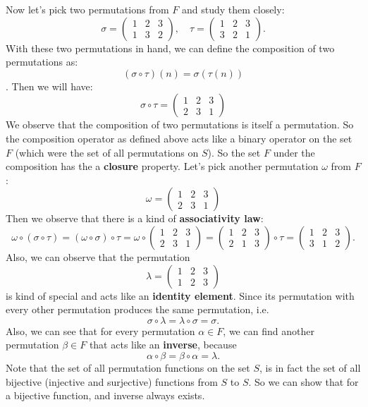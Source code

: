 Now let's pick two permutations from $F$ and study them closely:
\[ \sigma = \begin{pmatrix} 1 & 2 & 3 \\ 1 & 3 & 2 \end{pmatrix}, \quad
	\tau = \begin{pmatrix} 1 & 2 & 3 \\ 3 & 2 & 1 \end{pmatrix}. \]
With these two permutations in hand, we can define the composition of two permutations as: \[(\sigma \circ \tau)(n) = \sigma (\tau (n)) \]. Then we will have:
\[\sigma \circ \tau = \begin{pmatrix} 1 & 2 & 3 \\ 2 & 3 & 1 \end{pmatrix} \]
We observe that the composition of two permutations is itself a permutation. So the composition operator as defined above acts like a binary operator on the set $F$ (which were the set of all permutations on $S$). So the set $F$ under the composition has the a \textbf{closure} property. Let's pick another permutation $\omega$ from $F$:
\[ \omega = \begin{pmatrix} 1 & 2 & 3 \\ 2 & 3 & 1 \end{pmatrix} \]
Then we observe that there is a kind of \textbf{associativity law}:
\[ \omega \circ (\sigma \circ \tau) = (\omega \circ \sigma) \circ \tau = 
\omega \circ \begin{pmatrix} 1 & 2 & 3 \\ 2 & 3 & 1 \end{pmatrix} = 
\begin{pmatrix} 1 & 2 & 3 \\ 2 & 1 & 3 \end{pmatrix} \circ \tau
= \begin{pmatrix} 1 & 2 & 3 \\ 3 & 1 & 2 \end{pmatrix}.\]
Also, we can observe that the permutation \[  \lambda = \begin{pmatrix} 1 & 2 & 3 \\ 1 & 2 & 3 \end{pmatrix} \] is kind of special and acts like an \textbf{identity element}. Since its permutation with every other permutation produces the same permutation, i.e. \[ \sigma \circ \lambda = \lambda \circ \sigma = \sigma. \] Also, we can see that for every permutation $\alpha \in F$, we can find another permutation $\beta \in F$ that acts like an \textbf{inverse}, because \[\alpha \circ \beta = \beta \circ \alpha = \lambda. \] Note that the set of all permutation functions on the set $S$, is in fact the set of all bijective (injective and surjective) functions from $S$ to $S$. So we can show that for a bijective function, and inverse always exists. 

